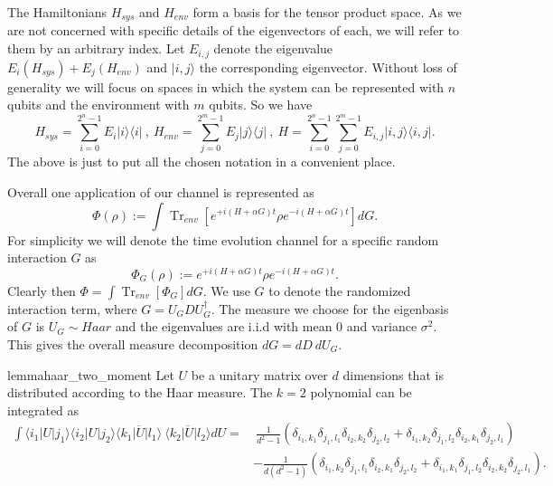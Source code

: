 \documentclass{article}
\newcommand{\ket}[1]{|#1\rangle}
\newcommand{\bra}[1]{\langle #1|}
\newcommand{\ketbra}[2]{| #1\rangle\! \langle #2|}
\newcommand{\parens}[1]{\left( #1 \right)}
\newcommand{\brackets}[1]{\left[ #1 \right]}
\DeclareMathOperator{\Tr}{Tr}
\newcommand{\partrace}[2]{\Tr_{#1} \brackets{ #2 }}
\begin{document}
The Hamiltonians $H_{sys}$ and $H_{env}$ form a basis for the tensor product space. As we are not concerned with specific details of the eigenvectors of each, we will refer to them by an arbitrary index. Let $E_{i,j}$ denote the eigenvalue $E_i(H_{sys}) + E_j(H_{env})$ and $\ket{i,j}$ the corresponding eigenvector. Without loss of generality we will focus on spaces in which the system can be represented with $n$ qubits and the environment with $m$ qubits. So we have
\begin{equation}
    H_{sys} = \sum_{i = 0}^{2^n - 1} E_i \ketbra{i}{i} ~,~ H_{env} = \sum_{j=0}^{2^m - 1} E_j \ketbra{j}{j} ~,~ H = \sum_{i=0}^{2^n - 1} \sum_{j=0}^{2^m - 1} E_{i,j} \ketbra{i,j}{i,j}.
\end{equation}
The above is just to put all the chosen notation in a convenient place. 


Overall one application of our channel is represented as
\begin{equation}
    \Phi(\rho) := \int \partrace{env}{e^{+i(H + \alpha G)t} \rho e^{-i(H + \alpha G) t}} dG.
\end{equation}
For simplicity we will denote the time evolution channel for a specific random interaction $G$ as
\begin{equation}
    \Phi_G(\rho) := e^{+i (H+ \alpha G) t} \rho e^{-i (H + \alpha G) t}.
\end{equation}
Clearly then $\Phi = \int \partrace{env}{\Phi_G} dG$. We use $G$ to denote the randomized interaction term, where $G = U_G D U_G^\dagger$. The measure we choose for the eigenbasis of $G$ is $U_G \sim Haar$ and the eigenvalues are i.i.d with mean 0 and variance $\sigma^2$. This gives the overall measure decomposition $dG = dD ~ dU_G$. 

\begin{restatable}{lemma}{haar_two_moment} \label{lem:haar_two_moment}
    Let $U$ be a unitary matrix over $d$ dimensions that is distributed according to the Haar measure. The $k=2$ polynomial can be integrated as
    \begin{align}
        \int \bra{i_1} U \ket{j_1} \bra{i_2} U \ket{j_2} \overline{\bra{k_1} U \ket{l_1}} ~ \overline{\bra{k_2} U \ket{l_2}} dU =& ~\frac{1}{d^2 - 1} \parens{\delta_{i_1, k_1} \delta_{j_1, l_1} \delta_{i_2, k_2} \delta_{j_2, l_2} + \delta_{i_1, k_2} \delta_{j_1, l_2} \delta_{i_2, k_1} \delta_{j_2, l_1}} \nonumber \\
        &- \frac{1}{d(d^2 - 1)} \parens{\delta_{i_1, k_2} \delta_{j_1, l_1} \delta_{i_2, k_1} \delta_{j_2, l_2} + \delta_{i_1, k_1} \delta_{j_1, l_2} \delta_{i_2, k_2} \delta_{j_2, l_1}}. \label{eq:haar_two_moment_integral}
    \end{align}
    \end{restatable}
\end{document}
